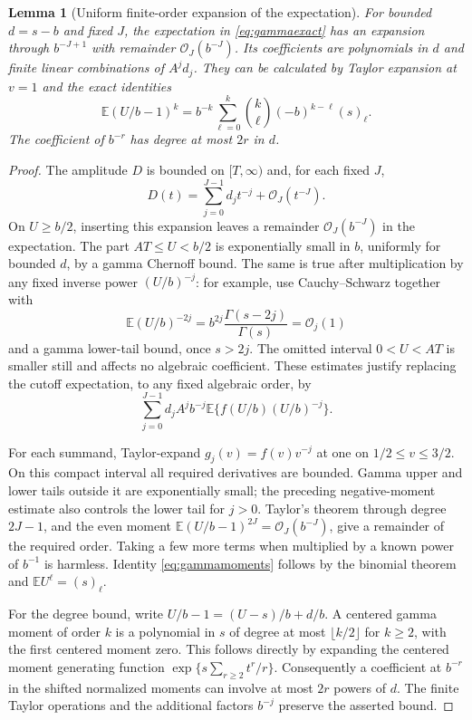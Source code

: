 \documentclass[11pt,a4paper]{article}
\newtheorem{lemma}[lemma]{Lemma}
\theoremstyle{definition}
\numberwithin{equation}{section}
\newcommand{\Oh}{\mathcal O}
\newcommand{\E}{\mathbb E}
\newcommand{\rising}[2]{(#1)_{#2}}
\begin{document}
\begin{lemma}[Uniform finite-order expansion of the expectation]
\label{lem:expectation}
For bounded $d=s-b$ and fixed $J$, the expectation in
\eqref{eq:gammaexact} has an expansion through $b^{-J+1}$ with remainder
$\Oh_J(b^{-J})$. Its coefficients are polynomials in $d$ and finite
linear combinations of $A^jd_j$. They can be calculated by Taylor
expansion at $v=1$ and the exact identities
\begin{equation}
 \E(U/b-1)^k
   =b^{-k}\sum_{\ell=0}^k\binom{k}{\ell}(-b)^{k-\ell}
                        \rising{s}{\ell}.
 \label{eq:gammamoments}
\end{equation}
The coefficient of $b^{-r}$ has degree at most $2r$ in $d$.
\end{lemma}
\begin{proof}
The amplitude $D$ is bounded on $[T,\infty)$ and, for each fixed $J$,
\[
 D(t)=\sum_{j=0}^{J-1}d_jt^{-j}+\Oh_J(t^{-J}).
\]
On $U\ge b/2$, inserting this expansion leaves a remainder
$\Oh_J(b^{-J})$ in the expectation. The part $AT\le U<b/2$ is
exponentially small in $b$, uniformly for bounded $d$, by a gamma Chernoff
bound. The same is true after multiplication by any fixed inverse power
$(U/b)^{-j}$: for example, use Cauchy--Schwarz together with
\[
 \E(U/b)^{-2j}=b^{2j}\frac{\Gamma(s-2j)}{\Gamma(s)}=\Oh_j(1)
\]
and a gamma lower-tail bound, once $s>2j$. The omitted interval
$0<U<AT$ is smaller still and affects no algebraic coefficient.
These estimates justify replacing the cutoff expectation, to any fixed
algebraic order, by
\[
 \sum_{j=0}^{J-1}d_j A^j b^{-j}
                  \E\{f(U/b)(U/b)^{-j}\}.
\]

For each summand, Taylor-expand $g_j(v)=f(v)v^{-j}$ at one on
$1/2\le v\le3/2$. On this compact interval all required derivatives are
bounded. Gamma upper and lower tails outside it are exponentially small;
the preceding negative-moment estimate also controls the lower tail for
$j>0$. Taylor's theorem through degree $2J-1$, and the even moment
$\E(U/b-1)^{2J}=\Oh_J(b^{-J})$, give a remainder of the required order.
Taking a few more terms when multiplied by a known power of $b^{-1}$ is
harmless. Identity \eqref{eq:gammamoments} follows by the binomial theorem
and $\E U^\ell=\rising{s}{\ell}$.

For the degree bound, write $U/b-1=(U-s)/b+d/b$.
A centered gamma moment of order $k$ is a polynomial in $s$ of degree
at most $\lfloor k/2\rfloor$ for $k\ge2$, with the first centered moment
zero. This follows directly by expanding the centered moment generating
function
$\exp\{s\sum_{r\ge2}t^r/r\}$.
Consequently a coefficient at $b^{-r}$ in the shifted normalized moments
can involve at most $2r$ powers of $d$. The finite Taylor operations and
the additional factors $b^{-j}$ preserve the asserted bound.
\end{proof}
\end{document}
